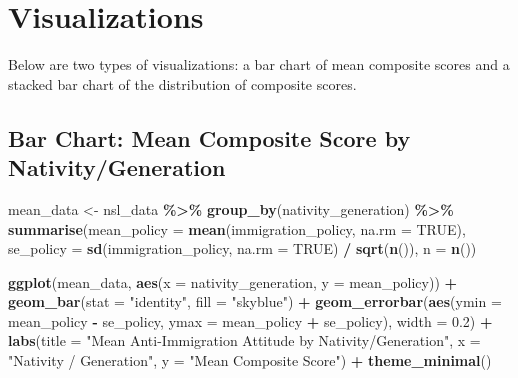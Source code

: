 \documentclass[
]{article}
\newenvironment{Shaded}{\begin{snugshade}}{\end{snugshade}}
\newcommand{\AttributeTok}[1]{\textcolor[rgb]{0.13,0.29,0.53}{#1}}
\newcommand{\ConstantTok}[1]{\textcolor[rgb]{0.56,0.35,0.01}{#1}}
\newcommand{\FloatTok}[1]{\textcolor[rgb]{0.00,0.00,0.81}{#1}}
\newcommand{\FunctionTok}[1]{\textcolor[rgb]{0.13,0.29,0.53}{\textbf{#1}}}
\newcommand{\NormalTok}[1]{#1}
\newcommand{\OtherTok}[1]{\textcolor[rgb]{0.56,0.35,0.01}{#1}}
\newcommand{\SpecialCharTok}[1]{\textcolor[rgb]{0.81,0.36,0.00}{\textbf{#1}}}
\newcommand{\StringTok}[1]{\textcolor[rgb]{0.31,0.60,0.02}{#1}}
\begin{document}
\section{Visualizations}\label{visualizations}

Below are two types of visualizations: a bar chart of mean composite
scores and a stacked bar chart of the distribution of composite scores.

\subsection{Bar Chart: Mean Composite Score by
Nativity/Generation}\label{bar-chart-mean-composite-score-by-nativitygeneration}

\begin{Shaded}
\begin{Highlighting}[]
\NormalTok{mean\_data }\OtherTok{\textless{}{-}}\NormalTok{ nsl\_data }\SpecialCharTok{\%\textgreater{}\%}
  \FunctionTok{group\_by}\NormalTok{(nativity\_generation) }\SpecialCharTok{\%\textgreater{}\%}
  \FunctionTok{summarise}\NormalTok{(}\AttributeTok{mean\_policy =} \FunctionTok{mean}\NormalTok{(immigration\_policy, }\AttributeTok{na.rm =} \ConstantTok{TRUE}\NormalTok{),}
            \AttributeTok{se\_policy =} \FunctionTok{sd}\NormalTok{(immigration\_policy, }\AttributeTok{na.rm =} \ConstantTok{TRUE}\NormalTok{) }\SpecialCharTok{/} \FunctionTok{sqrt}\NormalTok{(}\FunctionTok{n}\NormalTok{()),}
            \AttributeTok{n =} \FunctionTok{n}\NormalTok{())}

\FunctionTok{ggplot}\NormalTok{(mean\_data, }\FunctionTok{aes}\NormalTok{(}\AttributeTok{x =}\NormalTok{ nativity\_generation, }\AttributeTok{y =}\NormalTok{ mean\_policy)) }\SpecialCharTok{+}
  \FunctionTok{geom\_bar}\NormalTok{(}\AttributeTok{stat =} \StringTok{"identity"}\NormalTok{, }\AttributeTok{fill =} \StringTok{"skyblue"}\NormalTok{) }\SpecialCharTok{+}
  \FunctionTok{geom\_errorbar}\NormalTok{(}\FunctionTok{aes}\NormalTok{(}\AttributeTok{ymin =}\NormalTok{ mean\_policy }\SpecialCharTok{{-}}\NormalTok{ se\_policy, }\AttributeTok{ymax =}\NormalTok{ mean\_policy }\SpecialCharTok{+}\NormalTok{ se\_policy), }\AttributeTok{width =} \FloatTok{0.2}\NormalTok{) }\SpecialCharTok{+}
  \FunctionTok{labs}\NormalTok{(}\AttributeTok{title =} \StringTok{"Mean Anti{-}Immigration Attitude by Nativity/Generation"}\NormalTok{,}
       \AttributeTok{x =} \StringTok{"Nativity / Generation"}\NormalTok{,}
       \AttributeTok{y =} \StringTok{"Mean Composite Score"}\NormalTok{) }\SpecialCharTok{+}
  \FunctionTok{theme\_minimal}\NormalTok{()}
\end{Highlighting}
\end{Shaded}
\end{document}
